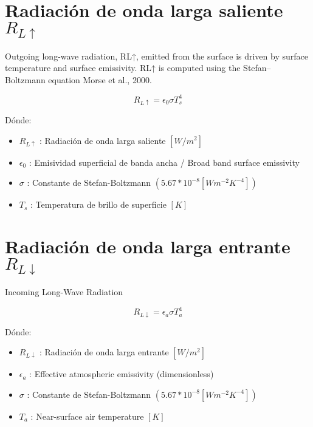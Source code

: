   
\section{Radiación de onda larga saliente $R_{L\uparrow}$}

Outgoing long-wave radiation, RL↑, emitted from the surface is
driven by surface temperature and surface emissivity. RL↑ is computed using the Stefan–Boltzmann equation Morse et al., 2000.

$$
R_{L\uparrow} = \epsilon_0  \sigma  T_{s}^{4}
$$

Dónde:
\begin{itemize}
    \item $R_{L\uparrow}$ : Radiación de onda larga saliente $[W/m^2]$
    \item $\epsilon_0$ : Emisividad superficial de banda ancha / Broad band surface emissivity
    \item $\sigma$ : Constante de Stefan-Boltzmann $(5.67*10^{-8}[W m^{-2}K^{-4}])$
    \item $T_s$ : Temperatura de brillo de superficie $[K]$
\end{itemize}


\section{Radiación de onda larga entrante $R_{L\downarrow}$}

Incoming Long-Wave Radiation

\begin{equation}
R_{L\downarrow} = \epsilon_a  \sigma  T_{a}^{4}
\label{eq:1}
\end{equation}

Dónde:
\begin{itemize}
    \item $R_{L\downarrow}$ : Radiación de onda larga entrante $[W/m^2]$
    \item $\epsilon_a$ : Effective atmospheric emissivity (dimensionless)
    \item $\sigma$ : Constante de Stefan-Boltzmann $(5.67*10^{-8}[W m^{-2}K^{-4}])$
    \item $T_a$ : Near-surface air temperature $[K]$
\end{itemize}
  
